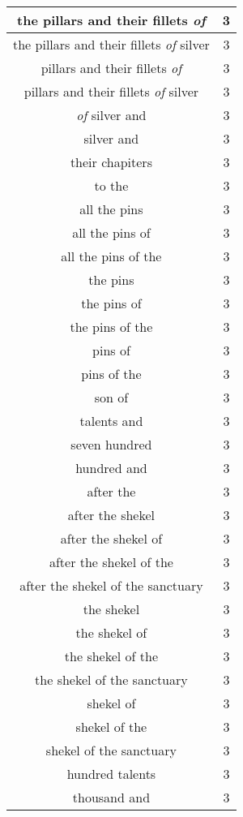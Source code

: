 \begin{center}
\begin{longtable}{|c|c|}
the pillars and their fillets \emph{of} & 3\\ \hline 
the pillars and their fillets \emph{of} silver & 3\\ \hline 
pillars and their fillets \emph{of} & 3\\ \hline 
pillars and their fillets \emph{of} silver & 3\\ \hline 
\emph{of} silver and & 3\\ \hline 
silver and & 3\\ \hline 
their chapiters & 3\\ \hline 
to the & 3\\ \hline 
all the pins & 3\\ \hline 
all the pins of & 3\\ \hline 
all the pins of the & 3\\ \hline 
the pins & 3\\ \hline 
the pins of & 3\\ \hline 
the pins of the & 3\\ \hline 
pins of & 3\\ \hline 
pins of the & 3\\ \hline 
son of & 3\\ \hline 
talents and & 3\\ \hline 
seven hundred & 3\\ \hline 
hundred and & 3\\ \hline 
after the & 3\\ \hline 
after the shekel & 3\\ \hline 
after the shekel of & 3\\ \hline 
after the shekel of the & 3\\ \hline 
after the shekel of the sanctuary & 3\\ \hline 
the shekel & 3\\ \hline 
the shekel of & 3\\ \hline 
the shekel of the & 3\\ \hline 
the shekel of the sanctuary & 3\\ \hline 
shekel of & 3\\ \hline 
shekel of the & 3\\ \hline 
shekel of the sanctuary & 3\\ \hline 
hundred talents & 3\\ \hline 
thousand and & 3\\ \hline 
\end{longtable}
\end{center}





